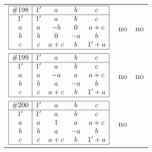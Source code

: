 \documentclass[12pt]{article}
\newcommand{\join}{\mathbin{+}}%
\newcommand{\id}{{1'}}%
\renewcommand{\top}{1}%
\begin{document}
\begin{center}
\begin{longtable}{l|c|c}
$
\begin{array}{|c|cccc|} \hline
\#198 & \id & a & b & c \\ \hline
\id & \id & a & b & c \\
a & a & -b & 0 & a \join c \\
b & b & 0 & -a & b \\
c & c & a \join c & b & \id \join a \\ \hline
\end{array}
$
 & no  
 & no      \\[15mm]

$
\begin{array}{|c|cccc|} \hline
\#199 & \id & a & b & c \\ \hline
\id & \id & a & b & c \\
a & a & -a & a & a \join c \\
b & b & a & -a & b \\
c & c & a \join c & b & \id \join a \\ \hline
\end{array}
$
 & no  
 & no      \\[15mm]

$
\begin{array}{|c|cccc|} \hline
\#200 & \id & a & b & c \\ \hline
\id & \id & a & b & c \\
a & a & \top & a & a \join c \\
b & b & a & -a & b \\
c & c & a \join c & b & \id \join a \\ \hline
\end{array}
$
 & no  
 & \adjustbox{valign=c, max height=1.6cm}{$
\left[ \begin{array}{ccccccc}
\id & a & a & b & c & a & b \\ 
a & \id & a & a & a & c & a \\ 
a & a & \id & a & a & c & a \\ 
b & a & a & \id & b & a & b \\ 
c & a & a & b & \id & a & b \\ 
a & c & c & a & a & \id & a \\ 
b & a & a & b & b & a & \id
\end{array}\right]
$}      \\[15mm]


\end{longtable}
\end{center}
\end{document}
